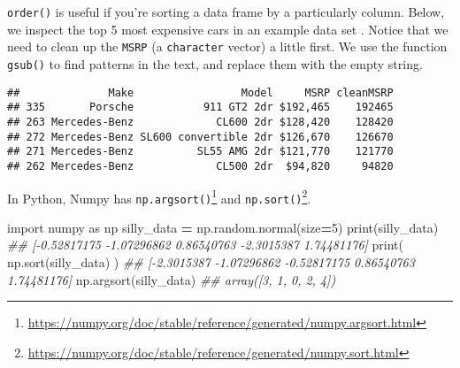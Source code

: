 \documentclass[
  12pt,
  krantz2]{krantz}
\makeatletter
\newenvironment{Shaded}{\begin{snugshade}}{\end{snugshade}}
\newcommand{\AttributeTok}[1]{\textcolor[rgb]{0.61,0.61,0.61}{#1}}
\newcommand{\BuiltInTok}[1]{#1}
\newcommand{\CommentTok}[1]{\textcolor[rgb]{0.37,0.37,0.37}{\textit{#1}}}
\newcommand{\ConstantTok}[1]{\textcolor[rgb]{0,0,0}{#1}}
\newcommand{\DecValTok}[1]{\textcolor[rgb]{0.06,0.06,0.06}{#1}}
\newcommand{\FunctionTok}[1]{\textcolor[rgb]{0,0,0}{#1}}
\newcommand{\ImportTok}[1]{#1}
\newcommand{\NormalTok}[1]{#1}
\newcommand{\OperatorTok}[1]{\textcolor[rgb]{0.43,0.43,0.43}{\textbf{#1}}}
\newcommand{\OtherTok}[1]{\textcolor[rgb]{0.37,0.37,0.37}{#1}}
\newcommand{\SpecialCharTok}[1]{\textcolor[rgb]{0,0,0}{#1}}
\newcommand{\StringTok}[1]{\textcolor[rgb]{0.5,0.5,0.5}{#1}}
\renewcommand{\href}[2]{#2\footnote{\url{#1}}}
\newenvironment{kframe}{%
\medskip{}
\setlength{\fboxsep}{.8em}
 \def\at@end@of@kframe{}%
 \ifinner\ifhmode%
  \def\at@end@of@kframe{\end{minipage}}%
  \begin{minipage}{\columnwidth}%
 \fi\fi%
 \def\FrameCommand##1{\hskip\@totalleftmargin \hskip-\fboxsep
 \colorbox{shadecolor}{##1}\hskip-\fboxsep
     \hskip-\linewidth \hskip-\@totalleftmargin \hskip\columnwidth}%
 \MakeFramed {\advance\hsize-\width
   \@totalleftmargin\z@ \linewidth\hsize
   \@setminipage}}%
 {\par\unskip\endMakeFramed%
 \at@end@of@kframe}
\renewenvironment{Shaded}{\begin{kframe}}{\end{kframe}}
\makeatother
\begin{document}
\texttt{order()} is useful if you're sorting a data frame by a particularly column. Below, we inspect the top 5 most expensive cars in an example data set \citep{sas_cars}. Notice that we need to clean up the \texttt{MSRP} (a \texttt{character} vector) a little first. We use the function \texttt{gsub()} to find patterns in the text, and replace them with the empty string.

\begin{Shaded}
\end{Shaded}

\begin{verbatim}
##              Make                 Model     MSRP cleanMSRP
## 335       Porsche           911 GT2 2dr $192,465    192465
## 263 Mercedes-Benz             CL600 2dr $128,420    128420
## 272 Mercedes-Benz SL600 convertible 2dr $126,670    126670
## 271 Mercedes-Benz          SL55 AMG 2dr $121,770    121770
## 262 Mercedes-Benz             CL500 2dr  $94,820     94820
\end{verbatim}

In Python, Numpy has \href{https://numpy.org/doc/stable/reference/generated/numpy.argsort.html}{\texttt{np.argsort()}} and \href{https://numpy.org/doc/stable/reference/generated/numpy.sort.html}{\texttt{np.sort()}}.

\begin{Shaded}
\begin{Highlighting}[]
\ImportTok{import}\NormalTok{ numpy }\ImportTok{as}\NormalTok{ np}
\NormalTok{silly\_data }\OperatorTok{=}\NormalTok{ np.random.normal(size}\OperatorTok{=}\DecValTok{5}\NormalTok{)}
\BuiltInTok{print}\NormalTok{(silly\_data)}
\CommentTok{\#\# [{-}0.52817175 {-}1.07296862  0.86540763 {-}2.3015387   1.74481176]}
\BuiltInTok{print}\NormalTok{( np.sort(silly\_data) )}
\CommentTok{\#\# [{-}2.3015387  {-}1.07296862 {-}0.52817175  0.86540763  1.74481176]}
\NormalTok{np.argsort(silly\_data)}
\CommentTok{\#\# array([3, 1, 0, 2, 4])}
\end{Highlighting}
\end{Shaded}
\end{document}

